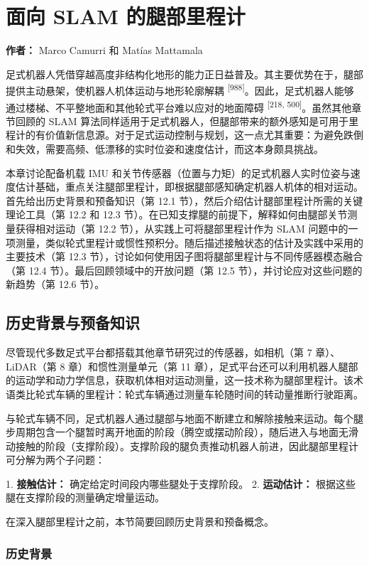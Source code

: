 \chapter{面向 SLAM 的腿部里程计}

\textbf{作者：} Marco Camurri 和 Matías Mattamala

足式机器人凭借穿越高度非结构化地形的能力正日益普及。其主要优势在于，腿部提供主动悬架，使机器人机体运动与地形轮廓解耦 \textsuperscript{[988]}。因此，足式机器人能够通过楼梯、不平整地面和其他轮式平台难以应对的地面障碍 \textsuperscript{[218, 500]}。虽然其他章节回顾的 SLAM 算法同样适用于足式机器人，但腿部带来的额外感知是可用于里程计的有价值新信息源。对于足式运动控制与规划，这一点尤其重要：为避免跌倒和失效，需要高频、低漂移的实时位姿和速度估计，而这本身颇具挑战。

本章讨论配备机载 IMU 和关节传感器（位置与力矩）的足式机器人实时位姿与速度估计基础，重点关注腿部里程计，即根据腿部感知确定机器人机体的相对运动。首先给出历史背景和预备知识（第 12.1 节），然后介绍估计腿部里程计所需的关键理论工具（第 12.2 和 12.3 节）。在已知支撑腿的前提下，解释如何由腿部关节测量获得相对运动（第 12.2 节），从实践上可将腿部里程计作为 SLAM 问题中的一项测量，类似轮式里程计或惯性预积分。随后描述接触状态的估计及实践中采用的主要技术（第 12.3 节），讨论如何使用因子图将腿部里程计与不同传感器模态融合（第 12.4 节）。最后回顾领域中的开放问题（第 12.5 节），并讨论应对这些问题的新趋势（第 12.6 节）。

\section{历史背景与预备知识}

尽管现代多数足式平台都搭载其他章节研究过的传感器，如相机（第 7 章）、LiDAR（第 8 章）和惯性测量单元（第 11 章），足式平台还可以利用机器人腿部的运动学和动力学信息，获取机体相对运动测量，这一技术称为腿部里程计。该术语类比轮式车辆的里程计：轮式车辆通过测量车轮随时间的转动量推断行驶距离。

与轮式车辆不同，足式机器人通过腿部与地面不断建立和解除接触来运动。每个腿步周期包含一个腿暂时离开地面的阶段（腾空或摆动阶段），随后进入与地面无滑动接触的阶段（支撑阶段）。支撑阶段的腿负责推动机器人前进，因此腿部里程计可分解为两个子问题：

1. \textbf{接触估计：} 确定给定时间段内哪些腿处于支撑阶段。
2. \textbf{运动估计：} 根据这些腿在支撑阶段的测量确定增量运动。

在深入腿部里程计之前，本节简要回顾历史背景和预备概念。

\subsection{历史背景}

